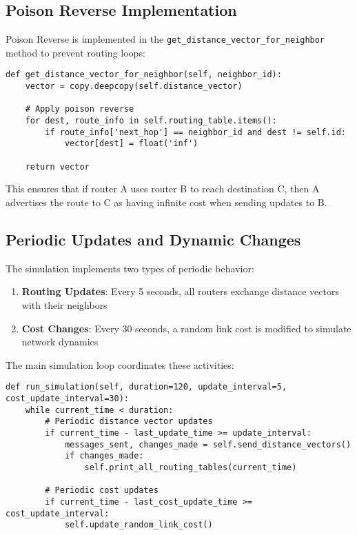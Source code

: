 \documentclass[12pt,a4paper]{article}
\begin{document}
\subsection{Poison Reverse Implementation}

Poison Reverse is implemented in the \texttt{get\_distance\_vector\_for\_neighbor} method to prevent routing loops:

\begin{lstlisting}[caption={Poison Reverse Implementation}]
def get_distance_vector_for_neighbor(self, neighbor_id):
    vector = copy.deepcopy(self.distance_vector)
    
    # Apply poison reverse
    for dest, route_info in self.routing_table.items():
        if route_info['next_hop'] == neighbor_id and dest != self.id:
            vector[dest] = float('inf')
    
    return vector
\end{lstlisting}

This ensures that if router A uses router B to reach destination C, then A advertises the route to C as having infinite cost when sending updates to B.

\subsection{Periodic Updates and Dynamic Changes}

The simulation implements two types of periodic behavior:

\begin{enumerate}
\item \textbf{Routing Updates}: Every 5 seconds, all routers exchange distance vectors with their neighbors
\item \textbf{Cost Changes}: Every 30 seconds, a random link cost is modified to simulate network dynamics
\end{enumerate}

The main simulation loop coordinates these activities:

\begin{lstlisting}[caption={Simulation Loop Structure}]
def run_simulation(self, duration=120, update_interval=5, cost_update_interval=30):
    while current_time < duration:
        # Periodic distance vector updates
        if current_time - last_update_time >= update_interval:
            messages_sent, changes_made = self.send_distance_vectors()
            if changes_made:
                self.print_all_routing_tables(current_time)
        
        # Periodic cost updates
        if current_time - last_cost_update_time >= cost_update_interval:
            self.update_random_link_cost()
\end{lstlisting}
\end{document}
